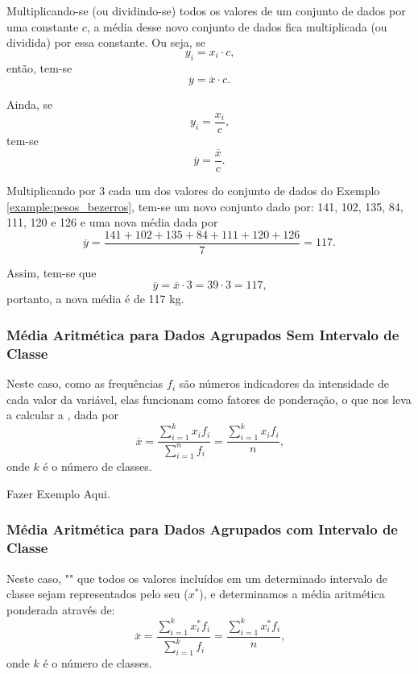 \documentclass[11pt,fleqn]{book}
\numberwithin{mpicture}{chapter}
\numberwithin{mtable}{chapter}
\numberwithin{mframe}{chapter}
\begin{document}
\begin{theorem}
	Multiplicando-se (ou dividindo-se) todos os valores de um conjunto de dados por uma constante $c$, a média desse novo conjunto de dados fica multiplicada (ou dividida) por essa constante. Ou seja, se
	\[
		y_i=x_i\cdot c\text{,}
	\]
	então, tem-se
	\[
		\overline{y}=\overline{x}\cdot c\text{.}
	\]
	
	Ainda, se
	\[
		y_i=\frac{x_i}{c}\text{,}
	\]
	tem-se
	\[
		\overline{y}=\frac{\overline{x}}{c}\text{.}
	\]
\end{theorem}

\begin{example}
	Multiplicando por 3 cada um dos valores do conjunto de dados do Exemplo \ref{example:pesos_bezerros}, tem-se um novo conjunto dado por: 141, 102, 135, 84, 111, 120 e 126 e uma nova média dada por
	\[
		\overline{y}=\frac{141+102+135+84+111+120+126}{7}=117\text{.}
	\]
	
	Assim, tem-se que
	\[
		\overline{y}=\overline{x}\cdot 3=39\cdot 3=117
		\text{,}
	\]
	portanto, a nova média é de 117 kg.
\end{example}

\subsubsection{Média Aritmética para Dados Agrupados Sem Intervalo de Classe}

Neste caso, como as frequências $f_i$ são números indicadores da intensidade de cada valor da variável, elas funcionam como fatores de ponderação, o que nos leva a calcular a , dada por
\[
	\overline{x}=\frac{
		\displaystyle \sum_{i=1}^{k} x_i f_i
	}{
		\displaystyle \sum_{i=1}^{n} f_i
	}
	= \frac{
		\displaystyle \sum_{i=1}^{k} x_i f_i
	}{
		n
	}
	\text{,}
\]
onde $k$ é o número de classes.

{\color{red}Fazer Exemplo Aqui.}

\subsubsection{Média Aritmética para Dados Agrupados com Intervalo de Classe}

Neste caso, "" que todos os valores incluídos em um determinado intervalo de classe sejam representados pelo seu  ($x^{*}$), e determinamos a média aritmética ponderada através de:
\[
	\overline{x}=\frac{	
		\displaystyle \sum_{i=1}^{k} x_i^{*} f_i
	}{
		\displaystyle \sum_{i=1}^{k} f_i
	}
	= \frac{
		\displaystyle \sum_{i=1}^{k} x_i^{*} f_i
	}{
		n
	}
	\text{,}
\]
onde $k$ é o número de classes.
\end{document}
